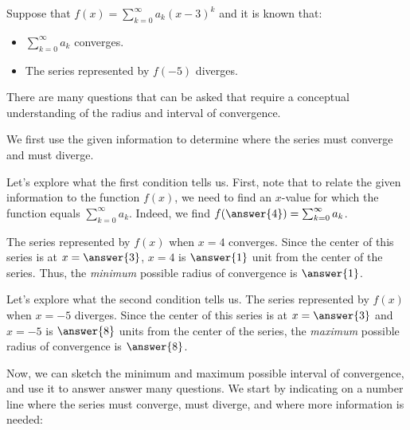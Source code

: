 \documentclass{ximera}
\author{Jim Talamo}
\begin{document}
\begin{exercise}
Suppose that $f(x) = \sum_{k=0}^{\infty} a_k (x-3)^k$ and it is known that:

\begin{itemize}
\item $\sum_{k=0}^{\infty} a_k$ converges.
\item The series represented by $f(-5)$ diverges.
\end{itemize}

There are many questions that can be asked that require a conceptual
understanding of the radius and interval of convergence.

We first use the given information to determine where the series must converge and must diverge.

\begin{exercise}
Let's explore what the first condition tells us.  First, note that to relate the given information to the function $f(x)$, we need to find an $x$-value for which the function equals $\sum_{k=0}^{\infty} a_k$.  Indeed, we find $f(\answer{4}) = \sum_{k=0}^{\infty} a_k$.  

\begin{exercise}
The series represented by $f(x)$ when $x=4$ converges.  Since the center of this series is at $x=\answer{3}$, $x=4$ is $\answer{1}$ unit from the center of the series.  Thus, the \emph{minimum} possible radius of convergence is $\answer{1}$.
\end{exercise}
\end{exercise}


\begin{exercise}
Let's explore what the second condition tells us.  The series represented by $f(x)$ when $x=-5$ diverges.  Since the center of this series is at $x=\answer{3}$ and $x=-5$ is $\answer{8}$ units from the center of the series, the \emph{maximum} possible radius of convergence is $\answer{8}$.
\end{exercise}

\begin{exercise}
Now, we can sketch the minimum and maximum possible interval of convergence, and use it to answer answer many questions.  We start by indicating on a number line where the series must converge, must diverge, and where more information is needed:

\begin{image}
\begin{tikzpicture}


\end{tikzpicture}
\end{image}
\end{exercise}
\end{exercise}
\end{document}
